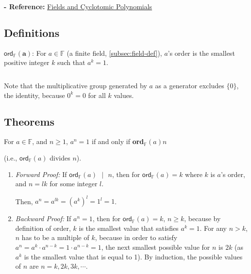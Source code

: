 \textbf{- Reference:} 
\href{https://e.math.cornell.edu/people/belk/numbertheory/CyclotomicPolynomials.pdf}{Fields and Cyclotomic Polynomials}~\cite{cyclotomic-polynomial}

\subsection{Definitions}
\label{subsec:order-def}

\begin{tcolorbox}[title={\textbf{\tboxdef{\ref*{subsec:order-def}} Order Definition}}]
$\bm{\textsf{ord}_{\mathbb{F}}(a)}$: For $a \in \mathbb{F}$ (a finite field, \autoref{subsec:field-def}), $a$'s order is the smallest positive integer $k$ such that $a^k = 1$. 

$ $


\end{tcolorbox}

Note that the multiplicative group generated by $a$ as a generator excludes $\{0\}$, the identity, because $0^k = 0$ for all $k$ values.

\subsection{Theorems}
\label{subsec:order-theorem}



\begin{tcolorbox}[title={\textbf{\tboxtheorem{\ref*{subsec:order-theorem}.1} Order Property (I)}}]
For $a \in \mathbb{F}$, and $n \geq 1$, $a^n = 1$ if and only if \textbf{\textsf{ord}}$_{\mathbb{F}}(a)  n$ 

(i.e., $\textsf{ord}_{\mathbb{F}}(a)$ divides $n$).
\end{tcolorbox}

\begin{myproof}
    \begin{enumerate}
    \item \textit{Forward Proof:} If $\textsf{ord}_{\mathbb{F}}(a) \text{ } | \text{ } n$, then for $\textsf{ord}_{\mathbb{F}}(a) = k$ where $k$ is $a$'s order, and $n = lk$ for some integer $l$. 
    
    Then, $a^n = a^{lk} = (a^k)^l = 1^l = 1$.
    \item \textit{Backward Proof:} If $a^n = 1$, then for $\textsf{ord}_{\mathbb{F}}(a) = k$, $n \geq k$, because by definition of order, $k$ is the smallest value that satisfies $a^k = 1$. For any $n > k$, $n$ has to be a multiple of $k$, because in order to satisfy $a^n = a^k \cdot a^{n - k} = 1 \cdot a^{n - k} = 1$, the next smallest possible value for $n$ is $2k$ (as $a^k$ is the smallest value that is equal to 1). By induction, the possible values of $n$ are $n = k, 2k, 3k, \cdots$.
    \end{enumerate}
\end{myproof}


